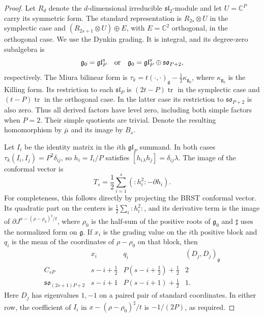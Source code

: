 \documentclass[11pt,a4paper]{amsart}
\numberwithin{equation}{section}
\theoremstyle{definition}
\theoremstyle{remark}
\newcommand{\C}{\mathbb C}
\newcommand{\g}{\mathfrak g}
\newcommand{\sog}{\mathfrak{so}}
\newcommand{\slg}{\mathfrak{sl}}
\newcommand{\glg}{\mathfrak{gl}}
\begin{document}
\begin{proof}
Let $R_d$ denote the $d$-dimensional irreducible
$\mathfrak{sl}_2$-module and let $U=\C^P$ carry its symmetric form.
The standard representation is $R_{2s}\otimes U$ in the symplectic
case and $(R_{2s+1}\otimes U)\oplus E$, with $E=\C^2$ orthogonal,
in the orthogonal case. We use the Dynkin grading. It is integral,
and its degree-zero subalgebra is
$$
 \g_0=\glg_P^s\quad\hbox{or}\quad
 \g_0=\glg_P^s\oplus\sog_{P+2},
$$
respectively. The Miura bilinear form is
$\tau_k=t(\cdot,\cdot)_\g-\frac12\kappa_{\g_0}$, where
$\kappa_{\g_0}$ is the Killing form. Its restriction to each
$\slg_P$ is $(2t-P)\operatorname{tr}$ in the symplectic case and
$(t-P)\operatorname{tr}$ in the orthogonal case. In the latter case
its restriction to $\sog_{P+2}$ is also zero. Thus all derived
factors have level zero, including both simple factors when $P=2$.
Their simple quotients are trivial. Denote the resulting homomorphism
by $\overline\mu$ and its image by $B_s$.

Let $I_i$ be the identity matrix in the $i$th $\glg_P$ summand.
In both cases $\tau_k(I_i,I_j)=P^2\delta_{ij}$, so
$h_i=I_i/P$ satisfies $[h_i{}_{\lambda}h_j]=\delta_{ij}\lambda$.
The image of the conformal vector is
$$
 T_s=\frac12\sum_{i=1}^s(:h_i^2:-\partial h_i).
$$
For completeness, this follows directly by projecting the BRST
conformal vector. Its quadratic part on the centers is
$\frac12\sum_i:h_i^2:$, and its derivative term is the image of
$\partial J^{x-(\rho-\rho_0)^\sharp/t}$, where $\rho_0$ is the
half-sum of the positive roots of $\g_0$ and $\sharp$ uses the
normalized form on $\g$. If $x_i$ is the grading value on the $i$th
positive block and $q_i$ is the mean of the coordinates of
$\rho-\rho_0$ on that block, then
$$
\begin{array}{c|c|c|c}
 &x_i&q_i&(D_j,D_j)_\g\\\hline
 C_{sP}&s-i+\frac12&P(s-i+\frac12)+\frac12&2\\
 \sog_{(2s+1)P+2}&s-i+1&P(s-i+1)+\frac12&1.
\end{array}
$$
Here $D_j$ has eigenvalues $1,-1$ on a paired pair of standard
coordinates. In either row, the coefficient of $I_i$ in
$x-(\rho-\rho_0)^\sharp/t$ is $-1/(2P)$, as required.


\end{proof}
\end{document}
